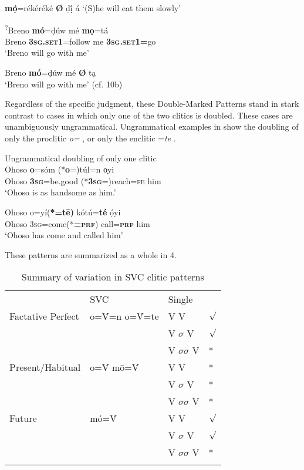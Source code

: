 \documentclass[output=paper]{langsci/langscibook}
\begin{document}
\ea
 \textbf{mọ́}=rékéréké \textbf{Ø} ḍị́ á 
\glt ‘(S)he will eat them slowly’
\z

\ea
\gll   \textsuperscript{?}Breno  \textbf{mó}=ḍúw    mé   \textbf{mọ}=tá    \\
     Breno     \textbf{\textsc{3sg.set1}}=follow  me  \textbf{\textsc{3sg.set1=}}go\\
\glt ‘Breno will go with me’
\z

\ea
   Breno \textbf{mó}=ḍúw mé \textbf{Ø} tạ\\
\glt ‘Breno will go with me’ (cf. 10b)
\z

Regardless of the specific judgment, these Double-Marked Patterns stand in stark contrast to cases in which only one of the two clitics is doubled. These cases are unambiguously ungrammatical. Ungrammatical examples in  show the doubling of only the proclitic \textit{o=} , or only the enclitic =\textit{te} . 

\ea
{Ungrammatical doubling of only one clitic}\\
\gll   Ohoso   \textbf{o}=sóm       (*\textbf{o}=)túl=n       o̩yi\\
       Ohoso  \textbf{\textsc{3sg}}=be.good   (*\textbf{\textsc{3sg}}=)reach=\textsc{fe}     him\\
\glt ‘Ohoso is as handsome as him.’
\z

\ea
\gll   Ohoso  o=yí(\textbf{*=tē)}      kótú=\textbf{té}    ọ́yi\\
       Ohoso  \textsc{3sg}=come(*\textbf{=}\textbf{\textsc{prf}})  call=\textbf{\textsc{prf}}    him\\
\glt ‘Ohoso has come and called him’ \citep[285]{Kari2003a}
\z

These patterns are summarized as a whole in 4.

\begin{table}

\begin{tabularx}{\textwidth}{XXXX}
\lsptoprule

\multicolumn{2}{X}{} & {SVC}  & {Single}\\
{Factative} {Perfect} & {o=\'{V}=n} {o=\'{V}=te} & {V V} & {${\surd}$}\\
\hhline{--~~} &  & {V $\sigma $ V} & {${\surd}$}\\
&  & {V $\sigma \sigma $ V} & {*}\\
{Present/Habitual} & {o=\'{V} mō=\'{V}} & {V V} & {*}\\
&  & {V $\sigma $ V} & {*}\\
&  & {V $\sigma \sigma $ V} & {*}\\
{Future} & {mó=\'{V}} & {V V} & {${\surd}$}\\
\hhline{--~~} &  & {V $\sigma $ V} & {${\surd}$}\\
&  & {V $\sigma \sigma $ V} & {*}\\
\hhline{~~--}
\lspbottomrule
\end{tabularx}
\caption{Summary of variation in SVC clitic patterns}
\label{bkm:Ref448139790}
\end{table}
\end{document}
